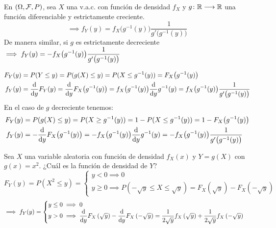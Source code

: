 \begin{teo}
	En $(\Omega, \mathcal{F}, P)$, sea $X$ una v.a.c. con función de densidad $f_X$ y $g \colon \mathbb{R} \longrightarrow \mathbb{R}$ una función diferenciable y estrictamente creciente.
	\[\implies f_Y(y)=f_X\big(g^{-1}(y)\big) \frac{1}{g'\big(g^{-1}(y)\big)}\]
	De manera similar, si $g$ es estrictamente decreciente$\displaystyle\implies f_Y(y)= - f_X\big(g^{-1}(y)\big) \frac{1}{g'\big(g^{-1}(y)\big)}$
	\begin{dem}
		\[\begin{aligned}
				F_Y(y) & = P(Y\leq y) = P(g(X)\leq y) = P(X\leq g^{-1}(y)) = F_X\big(g^{-1}(y)\big)                                                                                  \\
				f_Y(y) & = \odv{}{y} F_Y(y) = \odv{}{y} F_X\big(g^{-1}(y)\big) = f_X\big(g^{-1}(y)\big) \odv{}{y} g^{-1}(y) = f_X\big(g^{-1}(y)\big) \frac{1}{g'\big(g^{-1}(y)\big)}
			\end{aligned}\]
		En el caso de $g$ decreciente tenemos:
		\[\begin{aligned}
				F_Y(y) & = P(g(X)\leq y) = P(X\geq g^{-1}(y)) = 1 - P(X\leq g^{-1}(y)) = 1 - F_X\big(g^{-1}(y)\big)                                                  \\
				f_Y(y) & = -\odv{}{y} F_X\big(g^{-1}(y)\big) = -f_X\big(g^{-1}(y)\big) \odv{}{y} g^{-1}(y) = -f_X\big(g^{-1}(y)\big) \frac{1}{g'\big(g^{-1}(y)\big)}
			\end{aligned}\]
	\end{dem}
\end{teo}

\begin{ejer}
	Sea $X$ una variable aleatoria con función de densidad $f_X(x)$ y $Y=g(X)$ con $g(x)=x^2$. ¿Cuál es la función de densidad de $Y$?
	\[F_Y(y) = P(X^2\leq y)=\begin{cases}
			y<0 \implies 0 \\
			y\geq 0 \implies P\left(-\sqrt{y}\leq X\leq \sqrt{y}\right) = F_X\left(\sqrt{y}\right)-F_X\left(-\sqrt{y}\right)
		\end{cases}\]
	\[\implies f_Y(y)=\begin{cases}
			y \leq 0 \implies 0 \\
			y > 0 \implies \ds \odv{}{y} F_X\left(\sqrt{y}\right)-\odv{}{y} F_X\left(-\sqrt{y}\right) = \frac{1}{2\sqrt{y}} f_X\left(\sqrt{y}\right) + \frac{1}{2\sqrt{y}} f_X\left(-\sqrt{y}\right)
		\end{cases}\]
\end{ejer}

